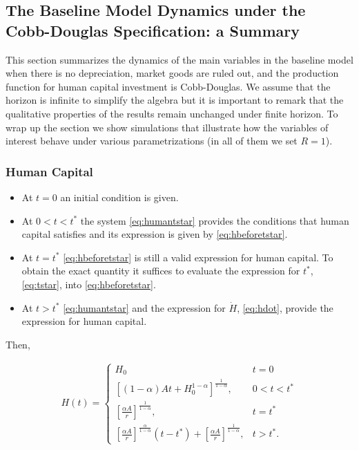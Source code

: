 \subsection{The Baseline Model Dynamics under the Cobb-Douglas Specification: a Summary}
This section summarizes the dynamics of the main variables in the baseline model when there is no depreciation, market goods are ruled out, and the production function for human capital investment is Cobb-Douglas. We assume that the horizon is infinite to simplify the algebra but it is important to remark that the qualitative properties of the results remain unchanged under finite horizon. To wrap up the section we show simulations that illustrate how the variables of interest behave under various parametrizations (in all of them we set $R = 1$). 

\subsubsection{Human Capital}
\begin{itemize}
\item At $t = 0$ an initial condition is given.
\item At $0 < t < t^*$ the system \eqref{eq:humantstar} provides the conditions that human capital satisfies and its expression is given by \eqref{eq:hbeforetstar}.
\item At $t = t^*$ \eqref{eq:hbeforetstar} is still a valid expression for human capital. To obtain the exact quantity it suffices to evaluate the expression for $t^*$, \eqref{eq:tstar}, into \eqref{eq:hbeforetstar}.
\item At $ t > t^* $ \eqref{eq:humantstar} and the expression for $\dot{H}$, \eqref{eq:hdot}, provide the expression for human capital.
\end{itemize}

Then,

\begin{eqnarray}
H(t) =
\begin{cases}
H_{0} & t = 0 \\
\left[ (1 - \alpha)At + H_{0}^{1-\alpha} \right]^{\frac{1}{1-\alpha}} , & 0 < t < t^* \\
\left[ \frac{\alpha A}{r} \right]^{\frac{1}{1 - \alpha}}, & t = t^* \\
\left[ \frac{\alpha A}{r} \right]^{\frac{ \alpha }{1 - \alpha}} \left( t - t^* \right) + \left[ \frac{\alpha A}{r} \right]^{\frac{1}{1 - \alpha}} , & t > t^*. \label{eq:humancapall}
\end{cases}
\end{eqnarray}

